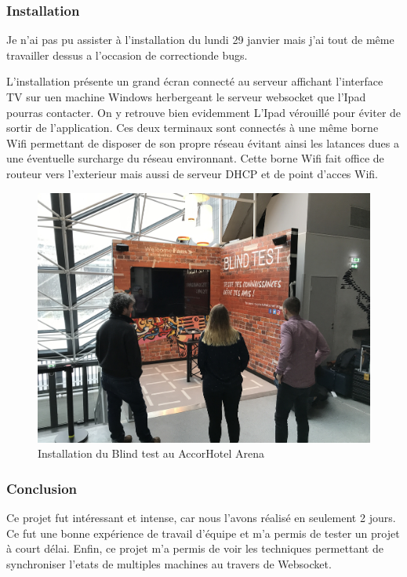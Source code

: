 \subsubsection{Installation}

Je n'ai pas pu assister à l'installation du lundi 29 janvier mais j'ai tout de même travailler dessus a l'occasion de correctionde bugs.

L'installation présente un grand écran connecté au serveur affichant l'interface TV sur uen machine Windows herbergeant le serveur websocket que l'Ipad pourras contacter.
On y retrouve bien evidemment L'Ipad vérouillé pour éviter de sortir de l'application.
Ces deux terminaux sont connectés à une même borne Wifi permettant de disposer de son propre réseau évitant ainsi les latances dues a une éventuelle surcharge du réseau environnant.
Cette borne Wifi fait office de routeur vers l'exterieur mais aussi de serveur DHCP et de point d'acces Wifi.

\begin{figure}[h]
    \centering
    \includegraphics[scale=0.1]{img/accorhotel-blindtest-resize.jpg}
    \caption{Installation du Blind test au AccorHotel Arena}
\end{figure}

\subsubsection{Conclusion}

Ce projet fut intéressant et intense, car nous l'avons réalisé en seulement 2 jours.
Ce fut une bonne expérience de travail d'équipe et m'a permis de tester un projet à court délai.
Enfin, ce projet m'a permis de voir les techniques permettant de synchroniser l'etats de multiples machines au travers de Websocket.